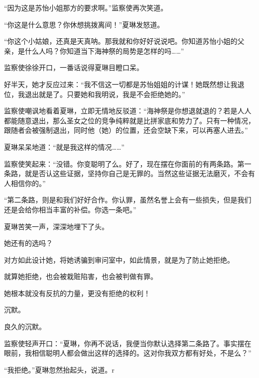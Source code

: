 \begin{this_body}
“因为这是苏怡小姐那方的要求啊。”监察使再次笑道。

“你这是什么意思？你休想挑拨离间！”夏琳发怒道。

“你这个小姑娘，还真是天真呐。那我就和你好好说说吧。你知道苏怡小姐的父亲，是什么人吗？你知道当下海神祭的局势是怎样的吗……”

监察使徐徐开口，一番话说得夏琳目瞪口呆。

好半天，她才反应过来：“我不信这一切都是苏怡姐姐的计谋！她既然想让我退位，我退出就是了。只要她和我明说，我是不会拒绝她的。”

监察使嘲讽地看着夏琳，立即无情地反驳道：“海神祭是你想退就退的？若是人人都能随意退出，那么圣女之位的竞争纯粹就是比拼家底和势力了。只有一种情况，跟随者会被强制退出，同时他（她）的位置，还会空缺下来，可以再塞人进去。”

夏琳呆呆地道：“就是我这样的情况……”

监察使笑起来：“没错。你变聪明了么。好了，现在摆在你面前的有两条路。第一条路，就是否认这些证据，坚持你自己是无罪的。当然这些证据无法磨灭，不会有人相信你的。”

“第二条路，则是和我们好好合作。你认罪，虽然名誉上会有一些损失，但是我们还是会给你相当丰富的补偿。你选一条吧。”

夏琳苦笑一声，深深地埋下了头。

她还有的选吗？

对方如此设计她，将她诱骗到审问室中，如此情景，就是为了防止她拒绝。

就算她拒绝，也会被栽赃陷害，也会被判做有罪。

她根本就没有反抗的力量，更没有拒绝的权利！

沉默。

良久的沉默。

监察使轻声开口：“夏琳，你再不说话，我便当你默认选择第二条路了。事实摆在眼前，我相信聪明人都会做出这样的选择的。这对你我双方都有好处，不是么？”

“我拒绝。”夏琳忽然抬起头，说道。r

\end{this_body}

